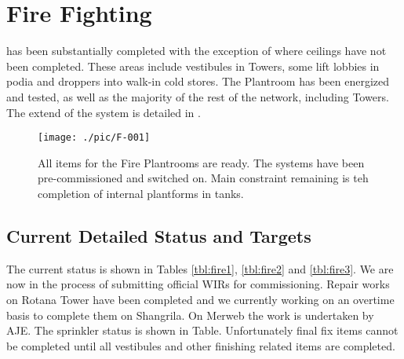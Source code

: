 
\chapter{Fire Fighting}


 has been substantially
completed with the exception of where ceilings have not been completed. These areas include vestibules in Towers, some lift lobbies in podia and droppers into walk-in cold stores. The
Plantroom has been energized and tested, as well as the majority of the rest of the network, including Towers. The extend of the system is detailed in .

\begin{figure*}
\texttt{[image: ./pic/F-001]}
\caption{All items for the Fire Plantrooms are ready. The systems have been pre-commissioned and
switched on. Main constraint remaining is teh completion of internal plantforms in tanks.}
\end{figure*}
 

\section{Current Detailed Status and Targets}

The current status is shown in Tables \ref{tbl:fire1}, \ref{tbl:fire2} and \ref{tbl:fire3}. We are now in the process of submitting official WIRs for commissioning. Repair works on Rotana Tower have been completed and we currently working on an overtime basis to complete them on Shangrila. On Merweb the work is undertaken by AJE. The sprinkler status is shown in Table. Unfortunately final fix items cannot be completed until all vestibules and other finishing related items are completed.

